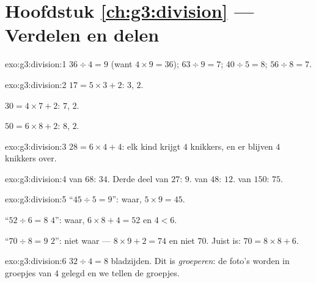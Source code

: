 \section*{Hoofdstuk \ref{ch:g3:division} --- Verdelen en delen}

\begin{solution}{exo:g3:division:1}
$36 \div 4 = 9$ (want $4 \times 9 = 36$); \quad
$63 \div 9 = 7$; \quad $40 \div 5 = 8$; \quad $56 \div 8 = 7$.
\end{solution}

\begin{solution}{exo:g3:division:2}
$17 = 5 \times 3 + 2$:  $3$,  $2$.

$30 = 4 \times 7 + 2$:  $7$,  $2$.

$50 = 6 \times 8 + 2$:  $8$,  $2$.
\end{solution}

\begin{solution}{exo:g3:division:3}
$28 = 6 \times 4 + 4$: elk kind krijgt $4$ knikkers, en er blijven $4$
knikkers over.
\end{solution}

\begin{solution}{exo:g3:division:4}
 van $68$: $34$. Derde deel van $27$: $9$.  van $48$: $12$.
 van $150$: $75$.
\end{solution}

\begin{solution}{exo:g3:division:5}
``$45 \div 5 = 9$'': waar, $5 \times 9 = 45$.

``$52 \div 6 = 8$  $4$'': waar, $6 \times 8 + 4 = 52$ en $4 < 6$.

``$70 \div 8 = 9$  $2$'': niet waar --- $8 \times 9 + 2 = 74$ en niet
$70$. Juist is: $70 = 8 \times 8 + 6$.
\end{solution}

\begin{solution}{exo:g3:division:6}
$32 \div 4 = 8$ bladzijden. Dit is \emph{groeperen}: de foto's worden in
groepjes van $4$ gelegd en we tellen de groepjes.
\end{solution}

